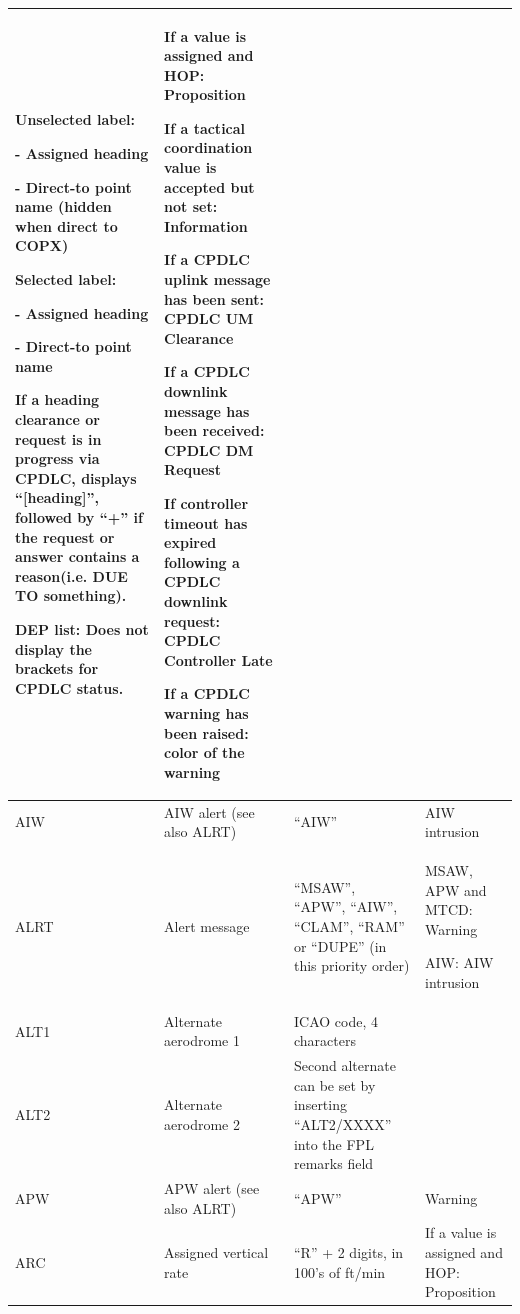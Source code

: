 \documentclass[11pt,a4paper,oldfontcommands]{memoir}
\begin{document}
\begin{landscape}
\begin{longtable}{|p{3cm}|p{4cm}|p{8cm}|p{6cm}|}
      Unselected label: 
      
      - Assigned heading 
      
      - Direct-to point name (hidden when  direct to COPX) 
      \bigskip
      
      Selected label: 
      
      - Assigned heading 
      
      - Direct-to point name 
      \bigskip
      
      If a heading clearance or request is  in progress via CPDLC, displays  “{[}heading{]}”, followed by “+” if the  request or answer contains a reason(i.e. DUE TO something). 
      \bigskip
     
      DEP list: 
      Does not display the  brackets for CPDLC status. &
      If a value is assigned and  HOP: Proposition 
      \bigskip

      If a tactical coordination  value is accepted but not  set: Information 
      \bigskip

      If a CPDLC uplink message  has been sent:  CPDLC UM Clearance 
      \bigskip
      
      If a CPDLC downlink  message has been  received:  CPDLC DM Request 
      \bigskip
      
      If controller timeout has  expired following a CPDLC  downlink request:  CPDLC Controller Late 
      \bigskip
      
      If a CPDLC warning has  been raised: color of the  warning \\ \hline
    AIW &
      AIW alert (see also ALRT) &
      “AIW” &
      AIW intrusion \\ \hline
    ALRT &
      Alert message &
      “MSAW”, “APW”, “AIW”, “CLAM”,  “RAM” or  “DUPE” (in this priority order) &
      MSAW, APW and MTCD: Warning 
      
      AIW: AIW intrusion \\ \hline
    ALT1 &
      Alternate aerodrome 1 &
      ICAO code, 4 characters &
       \\ \hline
    ALT2 &
      Alternate aerodrome 2 &
      Second alternate can be set by  inserting “ALT2/XXXX” into  the FPL remarks field &
       \\ \hline
    APW &
      APW alert (see also ALRT) &
      “APW” &
      Warning \\ \hline
    ARC &
      Assigned vertical rate &
      “R” + 2 digits, in 100’s of ft/min &
      If a value is assigned and  HOP: Proposition 
      

\end{longtable}
\end{landscape}
\end{document}
